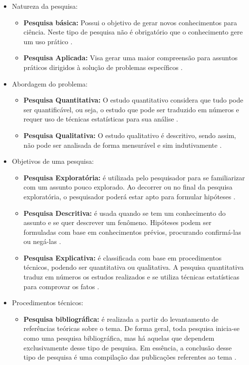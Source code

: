 \begin{itemize}
\item Natureza da pesquisa:
	\begin{itemize}
	\item \textbf{Pesquisa básica:} Possui o objetivo de gerar novos conhecimentos para ciência. Neste tipo de pesquisa não é obrigatório que o conhecimento gere um uso prático \cite{Tafner:2007}.
	\item \textbf{Pesquisa Aplicada:} Visa gerar uma maior compreensão para assuntos práticos dirigidos à solução de problemas específicos \cite{Tafner:2007}.
	\end{itemize}
\item Abordagem do problema:
	\begin{itemize}
	\item \textbf{Pesquisa Quantitativa:} O estudo quantitativo considera que tudo pode ser quantificável, ou seja, o estudo que pode ser traduzido em números e requer uso de técnicas estatísticas para sua análise \cite{Travassos:2002}.
	\item \textbf{Pesquisa Qualitativa:} O estudo qualitativo é descritivo, sendo assim, não pode ser analisada de forma mensurável e sim indutivamente \cite{Travassos:2002}.
	\end{itemize}
\item Objetivos de uma pesquisa:
	\begin{itemize}
	\item \textbf{Pesquisa Exploratória:} é utilizada pelo pesquisador para se familiarizar com um assunto pouco explorado. Ao decorrer ou no final da pesquisa exploratória, o pesquisador poderá estar apto para formular hipóteses \cite{Gil:2008}.
	\item \textbf{Pesquisa Descritiva:} é usada quando se tem um conhecimento do assunto e se quer descrever um fenômeno. Hipóteses podem ser formuladas com base em conhecimentos prévios, procurando confirmá-las ou negá-las \cite{Gil:2008}.
	\item \textbf{Pesquisa Explicativa:} é classificada com base em procedimentos técnicos, podendo ser quantitativa ou qualitativa. A pesquisa quantitativa traduz em números os estudos realizados e se utiliza técnicas estatísticas para comprovar os fatos \cite{Gil:2008}.
	\end{itemize}
\item Procedimentos técnicos:
	\begin{itemize}
	\item \textbf{Pesquisa bibliográfica:} é realizada a partir do levantamento de referências teóricas sobre o tema. De forma geral, toda pesquisa inicia-se como uma pesquisa bibliográfica, mas há aquelas que dependem exclusivamente desse tipo de pesquisa. Em essência, a conclusão desse tipo de pesquisa é uma compilação das publicações referentes ao tema \cite{Tafner:2007}.

\end{itemize}
\end{itemize}
